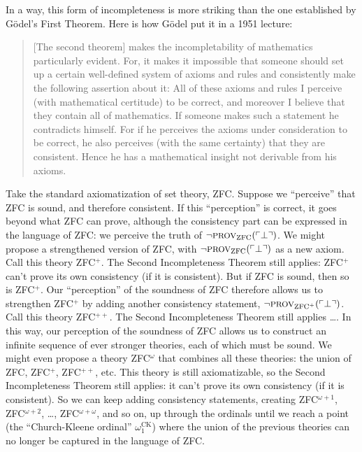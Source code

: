 In a way,
this form of incompleteness is more striking than
the one established by Gödel's First Theorem.
Here is how Gödel put it in a 1951 lecture:

\begin{quote}
  [The second theorem] makes the incompletability of mathematics particularly evident.
  For, it makes it impossible that someone should set up
  a certain well-defined system of axioms and rules and
  consistently make the following assertion about it:
  All of these axioms and rules I perceive (with mathematical certitude)
  to be correct,
  and moreover I believe that they contain all of mathematics.
  If someone makes such a statement he contradicts himself.
  For if he perceives the axioms under consideration to be correct,
  he also perceives (with the same certainty) that they are consistent.
  Hence he has a mathematical insight not derivable from his axioms. 
\end{quote}

Take the standard axiomatization of set theory, ZFC.
Suppose we ``perceive'' that ZFC is sound, and therefore consistent.
If this ``perception'' is correct,
it goes beyond what ZFC can prove,
although the consistency part can be expressed in the language of ZFC:
we perceive the truth of $\neg \smallcaps{Prov}_{\mathrm{ZFC}}(\gn{\bot})$.
We might propose a strengthened version of ZFC,
with $\neg \smallcaps{Prov}_{\mathrm{ZFC}}(\gn{\bot})$ as a new axiom.
Call this theory ZFC$^+$.
The Second Incompleteness Theorem still applies:
ZFC$^+$ can't prove its own consistency (if it is consistent).
But if ZFC is sound, then so is ZFC$^+$.
Our ``perception'' of the soundness of ZFC
therefore allows us to strengthen ZFC$^+$ by adding
another consistency statement,
$\neg \smallcaps{Prov}_{\mathrm{ZFC}^+}(\gn{\bot})$.
Call this theory ZFC$^{++}$.
The Second Incompleteness Theorem still applies \ldots.
In this way,
our perception of the soundness of ZFC
allows us to construct an infinite sequence of ever stronger theories,
each of which must be sound.
We might even propose a theory ZFC$^{\omega}$
that combines all these theories:
the union of ZFC, ZFC$^+$, ZFC$^{++}$, etc.
This theory is still axiomatizable,
so the Second Incompleteness Theorem still applies:
it can't prove its own consistency (if it is consistent).
So we can keep adding consistency statements,
creating ZFC$^{\omega+1}$, ZFC$^{\omega+2}$, \ldots, ZFC$^{\omega+\omega}$, and so on,
up through the ordinals until we reach a point
(the ``Church-Kleene ordinal'' $\omega_1^{\mathrm{CK}}$)
where the union of the previous theories
can no longer be captured in the language of ZFC.

